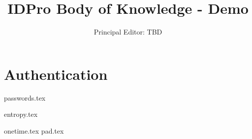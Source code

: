 \documentclass[11pt, oneside]{article}   	%
\title{IDPro Body of Knowledge - Demo}
\author{Principal Editor: TBD}
\begin{document}
\maketitle
{}
\newpage
{}
\tableofcontents
\newpage
\twocolumn
{}

\section{Authentication}




{passwords.tex}   

{entropy.tex}         

{onetime.tex}     
\newpage    
{pad.tex}         
\end{document}
